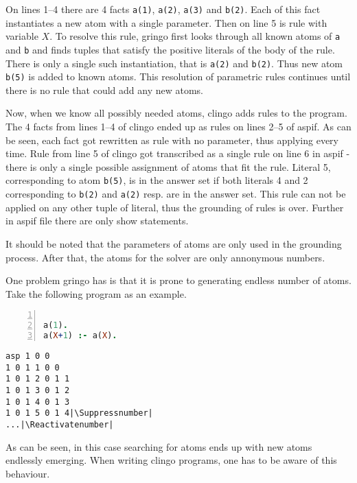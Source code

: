 \documentclass{fithesis}
\begin{document}
On lines 1--4 there are 4 facts \texttt{a(1)}, \texttt{a(2)}, \texttt{a(3)} and
\texttt{b(2)}. Each of this fact instantiates
a new atom with a single parameter. Then on line 5 is
rule with variable $X$. To resolve this rule, gringo first looks through
all known atoms of \texttt{a} and \texttt{b} and finds tuples that satisfy
the positive literals of the body of the rule. There is only a single such
instantiation, that is \texttt{a(2)} and \texttt{b(2)}. Thus new atom
\texttt{b(5)} is added to known atoms. This resolution of parametric rules
continues until there is no rule that could add any new atoms.

Now, when we know all possibly needed atoms, clingo adds rules to the program.
The 4 facts from lines 1--4 of clingo ended up as
rules on lines 2--5 of aspif. As can be seen,
each fact got rewritten as rule with no parameter, thus applying every time.
Rule from line 5 of clingo got transcribed as a single rule on line 6 in aspif
- there is only a single possible assignment of atoms that fit the rule.
Literal 5, corresponding to atom \texttt{b(5)}, is in the answer set
if both literals 4 and 2 corresponding to \texttt{b(2)} and \texttt{a(2)} resp.
are in the answer set. This rule can not be applied on any other tuple of
literal, thus the grounding of rules is over. Further in aspif file there are
only show statements.

It should be noted that the parameters of atoms are only used in the grounding
process. After that, the atoms for the solver are only annonymous numbers.

One problem gringo has is that it is prone to generating endless number
of atoms. Take the following program as an example.

\begin{minipage}[t]{0.45\linewidth}
\centering
\begin{lstlisting}[language=prolog, numbers=left, countblanklines=false]

a(1).
a(X+1) :- a(X).
\end{lstlisting}
\end{minipage}
\hspace{1em}
\begin{minipage}[t]{0.45\linewidth}
\centering
\begin{lstlisting}[numbers=right, countblanklines=false]
asp 1 0 0
1 0 1 1 0 0
1 0 1 2 0 1 1
1 0 1 3 0 1 2
1 0 1 4 0 1 3
1 0 1 5 0 1 4|\Suppressnumber|
...|\Reactivatenumber|
\end{lstlisting}
\end{minipage}
As can be seen, in this case searching for atoms ends up with new atoms
endlessly emerging. When writing clingo programs, one has to be aware of this
behaviour.
\end{document}
